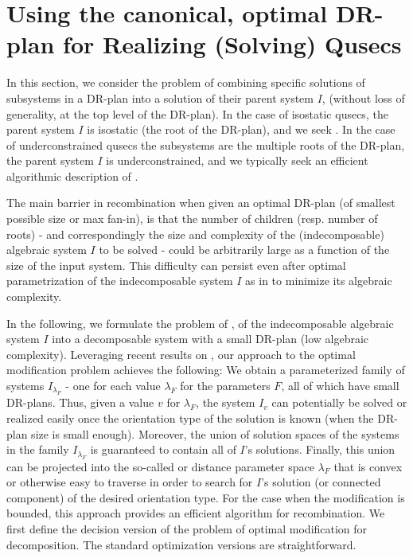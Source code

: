 \section{Using the canonical, optimal DR-plan for Realizing (Solving) Qusecs}
\label{sec:recomb}

In this section, we consider the  problem
of combining specific solutions of subsystems in a DR-plan into a
solution of their parent system $I$, (without loss of generality, at
the top level of the DR-plan). In the case of isostatic qusecs, the
parent system $I$ is isostatic (the root of the DR-plan), and we seek
. In the case of underconstrained
qusecs the subsystems are the multiple roots of the DR-plan, the
parent system $I$ is underconstrained, and we typically seek an
efficient algorithmic description of .

The main barrier in recombination when given an optimal DR-plan (of
smallest possible size or max fan-in),  is that the number of children
(resp. number of roots) - and correspondingly the  size and complexity
of the (indecomposable) algebraic system $I$ to be solved - could be
arbitrarily large as a function of the size of the input system. This
difficulty can persist even after optimal parametrization of the
indecomposable system $I$ as in \cite{sitharam2010optimized} to minimize its algebraic
complexity.

In the following, we formulate the problem of , of the indecomposable algebraic system $I$ into a
decomposable system with a small DR-plan (low algebraic complexity).
Leveraging recent results on , our
approach to the optimal modification problem achieves the following:
 We obtain a  parameterized family of systems
$I_{\lambda_F}$ -  one for each value $\lambda_F$ for the parameters
$F$,  all of which have small DR-plans. Thus, given a value $v$ for
$\lambda_F$, the system $I_v$ can potentially be solved or realized
easily once the orientation type of the solution is known  (when the
DR-plan size is small enough). 
Moreover, the union of solution spaces of the systems in the family
$I_{\lambda_F}$ is guaranteed to contain all of $I$'s solutions.  Finally, this union can be projected into the
so-called  or distance parameter space $\lambda_F$ that is
convex or otherwise easy to traverse in order to search for $I$'s
solution (or connected component) of the desired orientation type. For
the case when the modification is bounded, this approach provides an
efficient algorithm for recombination. We first define the decision
version of the problem of optimal modification for decomposition. The
standard optimization versions are straightforward.

